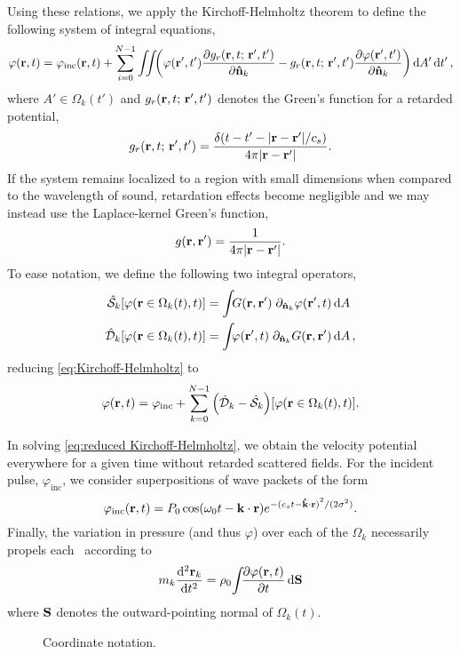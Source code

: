 Using these relations, we apply the Kirchoff-Helmholtz theorem to define the following system of integral equations,
\begin{equation}
  \varphi(\vb{r}, t) = \varphi_\text{inc}(\vb{r}, t) + \sum_{i = 0}^{N - 1} \iint_{}
  \qty( \varphi(\vb{r}',t') \pdv{\ensuremath{g_r(\vb{r}, t; \, \vb{r}', t')}}{\vu{n}_k} - g_r(\vb{r}, t; \, \vb{r}', t') \pdv{\varphi(\vb{r}',t')}{\vu{n}_k} ) \dd{A'} \dd{t'},
  \label{eq:Kirchoff-Helmholtz}
\end{equation}
where $A' \in \Omega_k(t')$ and $g_r(\vb{r}, t; \, \vb{r}', t')$ denotes the Green's function for a retarded potential,
\begin{equation}
  g_r(\vb{r}, t; \, \vb{r}', t') = \frac{\delta\qty(t - t' - \abs{\vb{r}-\vb{r}'}/c_s)}{4\pi \abs{\vb{r}-\vb{r}'}}.
  \label{eq:retarded green's function}
\end{equation}
If the system remains localized to a region with small dimensions when compared to the wavelength of sound, retardation effects become negligible and we may instead use the Laplace-kernel Green's function,
\begin{equation}
  g\qty(\vb{r}, \vb{r}') = \frac{1}{4\pi\abs{\vb{r} - \vb{r}'}}.
  \label{eq:green's function}
\end{equation}
To ease notation, we define the following two integral operators,
\begin{subequations}
\begin{align}
  \hat{\mathcal{S}}_k\qty[\varphi(\vb{r} \in \Omega_k(t), t)] &= \int_{} G(\vb{r}, \vb{r}') \; \partial_{\vu{n}_k} \varphi(\vb{r}',t) \dd{A}
  \label{eq:single layer}\\
  \hat{\mathcal{D}}_k\qty[\varphi(\vb{r} \in \Omega_k(t), t)] &= \int_{} \varphi(\vb{r}',t) \; \partial_{\vu{n}_k} G(\vb{r}, \vb{r}') \dd{A}, \label{eq:double layer}
\end{align}
  \label{eq:operator_kirchoff}
\end{subequations}
reducing \cref{eq:Kirchoff-Helmholtz} to
\begin{equation}
  \varphi(\vb{r},t) = \varphi_\text{inc} + \sum_{k = 0}^{N - 1} \qty(\hat{\mathcal{D}}_k - \hat{\mathcal{S}}_k)\qty[\varphi(\vb{r} \in \Omega_k(t), t)].
  \label{eq:reduced Kirchoff-Helmholtz}
\end{equation}

In solving \cref{eq:reduced Kirchoff-Helmholtz}, we obtain the velocity potential everywhere for a given time without retarded scattered fields.
For the incident pulse, $\varphi_\text{inc}$, we consider superpositions of wave packets of the form
\begin{equation}
  \varphi_\text{inc}(\vb{r}, t) = P_0\cos(\omega_0 t - \vb{k}\cdot\vb{r})e^{-{(c_s t - \vu{k}\cdot\vb{r})}^2/(2 \sigma^2)}.
  \label{eq:inc_field}
\end{equation}
Finally, the variation in pressure (and thus $\varphi$) over each of the $\Omega_k$ necessarily propels each \bubble\ according to
\begin{equation}
  m_k \dv[2]{\vb{r}_k}{t} = \rho_0 \! \int_{} \pdv{\varphi\qty(\vb{r}, t)}{t} \dd{\vb{S}}
  \label{eq:Newton}
\end{equation}
where $\vb{S}$ denotes the outward-pointing normal of $\Omega_k(t)$.

\begin{figure}[t]
  \centering
  \caption{\label{fig:diagram}Coordinate notation.}
\end{figure}
